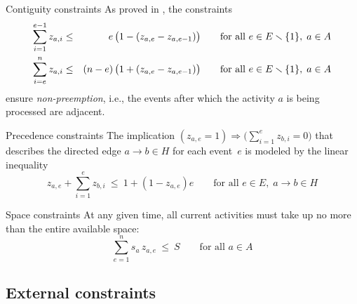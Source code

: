 \documentclass[11pt,reqno]{amsart}
\newcommand{\lra}{\longrightarrow}
\numberwithin{equation}{section}
\begin{document}
\begin{mydesc}
\item[Contiguity constraints] As proved in \cite[Proposition 1]{artigues-etal11a}, the
  constraints
  \begin{eqnarray}
    \sum_{i=1}^{e-1} z_{a,i}
    &\le&
    \phantom{(n-e)}\llap{$e$}\,\big(1-(z_{a,e} - z_{a,e-1})\big)
    \qquad\text{for all } e\in E\smallsetminus\{1\},\; a\in A
    \\
    \sum_{i=e}^n z_{a,i}
    &\le&
    (n-e)\,\big(1+(z_{a,e} - z_{a,e-1})\big)
    \qquad\text{for all } e\in E\smallsetminus\{1\},\; a\in A
  \end{eqnarray}
  ensure \emph{non-preemption}, i.e., the events after which the activity $a$ is being
  processed are adjacent.

\item[Precedence constraints] The implication $(z_{a,e}=1) \Longrightarrow
  \big(\sum_{i=1}^{e} z_{b,i}=0\big)$ that describes the directed edge $a\lra b\in H$ for
  each event~$e$ is modeled by the linear inequality
  \begin{equation}
     z_{a,e} + \sum_{i=1}^e z_{b,i}
     \ \le \
     1+(1-z_{a,e})e
     \qquad\text{for all } e\in E,\; a\lra b\in H
  \end{equation}

\item[Space constraints] At any given time, all current activities must take up no more
  than the entire available space:
  \begin{equation}
    \sum_{e=1}^n s_a \, z_{a,e} 
    \ \le \
    S \qquad\text{for all } a\in A
  \end{equation}
\end{mydesc}

\subsection{External constraints}
\end{document}
